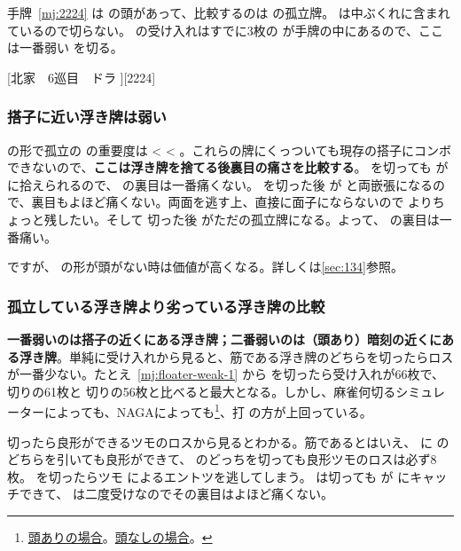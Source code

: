 \documentclass[../nankiru_main.tex]{subfiles}
\begin{document}
手牌~\ref{mj:2224} は  の頭があって、比較するのは  の孤立牌。 は中ぶくれに含まれているので切らない。 の受け入れはすでに3枚の  が手牌の中にあるので、ここは一番弱い  を切る\citep[][pp.~139--140]{ooi-gundou}。

[北家　6巡目　ドラ ][2224]


\subsubsection*{搭子に近い浮き牌は弱い}

 の形で孤立の  の重要度は  \textless{}  \textless{} 。これらの牌にくっついても現存の搭子にコンボできないので、\textbf{ここは浮き牌を捨てる後裏目の痛さを比較する}。 を切っても  が  に拾えられるので、 の裏目は一番痛くない。 を切った後  が  と両嵌張になるので、裏目もよほど痛くない。両面を逃す上、直接に面子にならないので  よりちょっと残したい。そして  切った後  がただの孤立牌になる。よって、 の裏目は一番痛い。

ですが、 の形が頭がない時は価値が高くなる。詳しくは\ref{sec:134}参照。


\subsubsection*{孤立している浮き牌より劣っている浮き牌の比較}

\textbf{一番弱いのは搭子の近くにある浮き牌；二番弱いのは（頭あり）暗刻の近くにある浮き牌}。単純に受け入れから見ると、筋である浮き牌のどちらを切ったらロスが一番少ない。たとえ~\ref{mj:floater-weak-1} から  を切ったら受け入れが66枚で、 切りの61枚と  切りの56枚と比べると最大となる。しかし、麻雀何切るシミュレーターによっても、NAGAによっても\footnote{\href{https://naga.dmv.nico/htmls/27871cdf40fcd21ce0e66a8fd22aa2a728d870df2cf0e106f91df73a50c68173v2_2.html?tw=0}{頭ありの場合}。\href{https://naga.dmv.nico/htmls/b7b766a6a85e7bca4875e7f3b79d0ba3a20cbccabbc8e9ecfb4207417d538efav2_2.html?tw=0}{頭なしの場合}。}、打  の方が上回っている。

切ったら良形ができるツモのロスから見るとわかる。筋であるとはいえ、 に  のどちらを引いても良形ができて、 のどっちを切っても良形ツモのロスは必ず8枚。 を切ったらツモ  によるエントツを逃してしまう。 は切っても  が  にキャッチできて、 は二度受けなのでその裏目はよほど痛くない。
\end{document}
